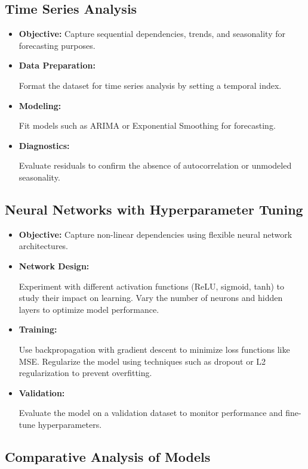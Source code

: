 \documentclass[english,12pt, titlepage]{article}
\begin{document}
	\subsection{Time Series Analysis}
	\begin{itemize}
		\item \textbf{Objective:} Capture sequential dependencies, trends, and seasonality for forecasting purposes.
		\item 
		\textbf{	Data Preparation:}
		
		Format the dataset for time series analysis by setting a temporal index.
		
		\item \textbf{Modeling:}
		
		Fit models such as ARIMA or Exponential Smoothing for forecasting.
		
		\item \textbf{Diagnostics:}
		
		Evaluate residuals to confirm the absence of autocorrelation or unmodeled seasonality.
	\end{itemize}
	
	
	\subsection{Neural Networks with Hyperparameter Tuning}
	\begin{itemize}
		\item \textbf{	Objective: }Capture non-linear dependencies using flexible neural network architectures.
		\item 	
		\textbf{Network Design:}
		
		Experiment with different activation functions (ReLU, sigmoid, tanh) to study their impact on learning.
		Vary the number of neurons and hidden layers to optimize model performance.
		\item 	\textbf{Training:}
		
		Use backpropagation with gradient descent to minimize loss functions like MSE.
		Regularize the model using techniques such as dropout or L2 regularization to prevent overfitting.
		\item \textbf{	Validation:}
		
		Evaluate the model on a validation dataset to monitor performance and fine-tune hyperparameters.
	\end{itemize}
	
	
	
	\subsection{Comparative Analysis of Models}
	
\end{document}
